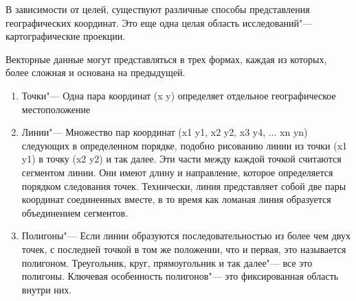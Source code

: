 В зависимости от целей, существуют различные способы представления
географических координат. Это еще одна целая область исследований"---
картографические проекции.

Векторные данные могут представляться в трех формах, каждая из которых,
более сложная и основана на предыдущей.

\begin{enumerate}
\item Точки"--- Одна пара координат (x y) определяет отдельное
географическое местоположение
\item Линии"--- Множество пар координат (x1 y1, x2 y2, x3 y4, ... xn yn)
следующих в определенном порядке, подобно рисованию линии из точки
(x1 y1) в точку (x2 y2) и так далее. Эти части между каждой точкой
считаются сегментом линии. Они имеют длину и направление, которое
определяется порядком следования точек. Технически, линия представляет
собой две пары координат соединенных вместе, в то время как ломаная
линия образуется объединением сегментов.
\item Полигоны"--- Если линии образуются последовательностью из более
чем двух точек, с последней точкой в том же положении, что и первая,
это называется полигоном. Треугольник, круг, прямоугольник и так далее"---
все это полигоны. Ключевая особенность полигонов"--- это фиксированная
область внутри них.
\end{enumerate}
